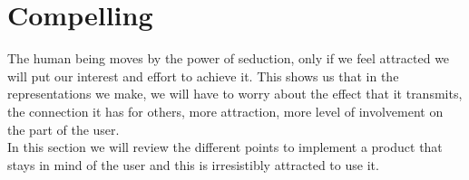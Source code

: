 \newpage
\section{Compelling}
The human being moves by the power of seduction, only if we feel attracted we will put our interest
and effort to achieve it. This shows us that in the representations we make, we will have to worry
about the effect that it transmits, the connection it has for others, more attraction, more level
of involvement on the part of the user.\\


In this section we will review the different points to implement a product that stays in mind
of the user and this is irresistibly attracted to use it.







